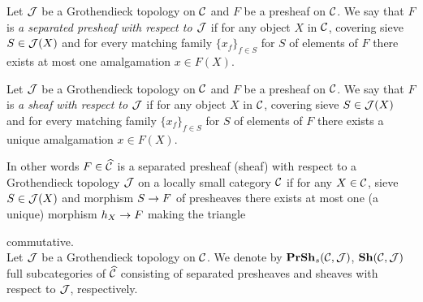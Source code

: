 \begin{definition}
Let ${\mathcal J}$ be a Grothendieck topology on ${\mathcal C}$ and $F$ be a presheaf on ${\mathcal C}$. We say that $F$ is \textit{a separated presheaf with respect to ${\mathcal J}$} if for any object $X$ in ${\mathcal C}$, covering sieve $S\in {\mathcal J}(X)$ and for every matching family $\{x_f\}_{f\in S}$ for $S$ of elements of $F$ there exists at most one amalgamation $x\in F(X)$.
\end{definition} 

\begin{definition}
Let ${\mathcal J}$ be a Grothendieck topology on ${\mathcal C}$ and $F$ be a presheaf on ${\mathcal C}$. We say that $F$ is \textit{a sheaf with respect to ${\mathcal J}$} if for any object $X$ in ${\mathcal C}$, covering sieve $S\in {\mathcal J}(X)$ and for every matching family $\{x_f\}_{f\in S}$ for $S$ of elements of $F$ there exists a unique amalgamation $x\in F(X)$.
\end{definition}
\noindent
In other words $F\in \widehat{{\mathcal C}}$ is a separated presheaf (sheaf) with respect to a Grothendieck topology ${\mathcal J}$ on a locally small category ${\mathcal C}$ if for any $X\in {\mathcal C}$, sieve $S\in {\mathcal J}(X)$ and morphism $S\rightarrow F$ of presheaves there exists at most one (a unique) morphism $h_X\rightarrow F$ making the triangle 
\begin{center}
\end{center}
commutative.\\
Let ${\mathcal J}$ be a Grothendieck topology on ${\mathcal C}$. We denote by $\mathbf{PrSh}_s({\mathcal C},{\mathcal J})$, $\mathbf{Sh}({\mathcal C},{\mathcal J})$  full subcategories of $\widehat{{\mathcal C}}$ consisting of separated presheaves and sheaves with respect to ${\mathcal J}$, respectively.

